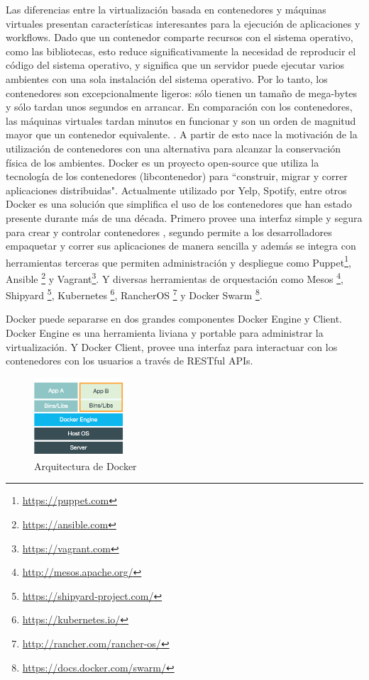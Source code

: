 Las diferencias entre la virtualización basada en contenedores y máquinas virtuales presentan características interesantes para la ejecución de aplicaciones y workflows. Dado que un contenedor comparte recursos con el sistema operativo, como las bibliotecas, esto reduce significativamente la necesidad de reproducir el código del sistema operativo, y significa que un servidor puede ejecutar varios ambientes con una sola instalación del sistema operativo. 
Por lo tanto, los contenedores son excepcionalmente ligeros: sólo tienen un tamaño de mega-bytes y sólo tardan unos segundos en arrancar. En comparación con los contenedores, las máquinas virtuales tardan minutos en funcionar y son un orden de magnitud mayor que un contenedor equivalente. \cite{padala2007performance,regola2010recommendations,felter2014updated}. A partir de esto nace la motivación de la utilización de contenedores con una alternativa para alcanzar la conservación física de los ambientes.
Docker es un proyecto open-source que utiliza la tecnología de los contenedores (libcontenedor) para ``construir, migrar y correr aplicaciones distribuidas". Actualmente utilizado por Yelp, Spotify, entre otros \cite{marmolnetworking}
Docker es una solución que simplifica el uso de los contenedores que han estado presente durante más de una década. Primero provee una interfaz simple y segura para crear y controlar contenedores \cite{bui2015analysis}, segundo permite a los desarrolladores empaquetar y correr sus aplicaciones de manera sencilla y además se integra con herramientas terceras que permiten administración y despliegue como Puppet\footnote{\url{https://puppet.com}}, Ansible \footnote{\url{https://ansible.com}} y Vagrant\footnote{\url{https://vagrant.com}}. Y diversas herramientas de orquestación como Mesos \footnote{\url{http://mesos.apache.org/}}, 
Shipyard \footnote{\url{https://shipyard-project.com/}},
Kubernetes \footnote{\url{https://kubernetes.io/}},
RancherOS \footnote{\url{http://rancher.com/rancher-os/}} y 
Docker Swarm \footnote{\url{https://docs.docker.com/swarm/}}.

Docker puede separarse en dos grandes componentes Docker Engine y Client.
Docker Engine es una herramienta liviana y portable para administrar la virtualización. Y Docker Client, provee una interfaz para interactuar con los contenedores con los usuarios a través de RESTful APIs\cite{bui2015analysis}.

\begin{figure}[t]
  \centering
  \includegraphics[width=0.3\textwidth]{Figures/docker.png}
    \caption{Arquitectura de Docker}
    \label{fig:docker}
\end{figure}


